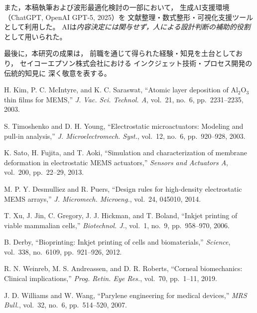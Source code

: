 \documentclass[conference]{IEEEtran}
\begin{document}
また，本稿執筆および波形最適化検討の一部において，
生成AI支援環境（ChatGPT, OpenAI GPT-5, 2025）を
文献整理・数式整形・可視化支援ツールとして利用した。
AIは\emph{内容決定には関与せず，人による設計判断の補助的役割}として用いられた。

\vspace{2pt}
\noindent
最後に，本研究の成果は，
前職を通じて得られた経験・知見を土台としており，
セイコーエプソン株式会社における
インクジェット技術・プロセス開発の伝統的知見に
深く敬意を表する。


\begin{thebibliography}{99}

H. Kim, P. C. McIntyre, and K. C. Saraswat,
``Atomic layer deposition of Al$_2$O$_3$ thin films for MEMS,''
\emph{J. Vac. Sci. Technol. A}, vol.~21, no.~6, pp.~2231--2235, 2003.

S. Timoshenko and D. H. Young,
``Electrostatic microactuators: Modeling and pull-in analysis,''
\emph{J. Microelectromech. Syst.}, vol.~12, no.~6, pp.~920--928, 2003.

K. Sato, H. Fujita, and T. Aoki,
``Simulation and characterization of membrane deformation in electrostatic MEMS actuators,''
\emph{Sensors and Actuators A}, vol.~200, pp.~22--29, 2013.

M. P. Y. Desmulliez and R. Puers,
``Design rules for high-density electrostatic MEMS arrays,''
\emph{J. Micromech. Microeng.}, vol.~24, 045010, 2014.

T. Xu, J. Jin, C. Gregory, J. J. Hickman, and T. Boland,
``Inkjet printing of viable mammalian cells,''
\emph{Biotechnol. J.}, vol.~1, no.~9, pp.~958--970, 2006.

B. Derby,
``Bioprinting: Inkjet printing of cells and biomaterials,''
\emph{Science}, vol.~338, no.~6109, pp.~921--926, 2012.

R. N. Weinreb, M. S. Andreassen, and D. R. Roberts,
``Corneal biomechanics: Clinical implications,''
\emph{Prog. Retin. Eye Res.}, vol.~70, pp.~1--11, 2019.

J. D. Williams and W. Wang,
``Parylene engineering for medical devices,''
\emph{MRS Bull.}, vol.~32, no.~6, pp.~514--520, 2007.


\end{thebibliography}
\end{document}
